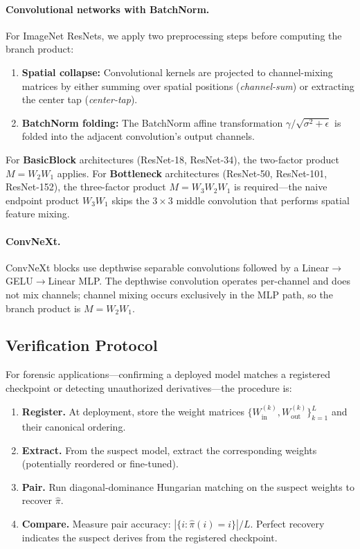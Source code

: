 \documentclass[wcp]{jmlr}
\begin{document}
\paragraph{Convolutional networks with BatchNorm.} For ImageNet ResNets, we apply two preprocessing steps before computing the branch product:
\begin{enumerate}[leftmargin=*,itemsep=2pt]
  \item \textbf{Spatial collapse:} Convolutional kernels are projected to channel-mixing matrices by either summing over spatial positions (\emph{channel-sum}) or extracting the center tap (\emph{center-tap}).
  \item \textbf{BatchNorm folding:} The BatchNorm affine transformation $\gamma / \sqrt{\sigma^2 + \epsilon}$ is folded into the adjacent convolution's output channels.
\end{enumerate}
For \textbf{BasicBlock} architectures (ResNet-18, ResNet-34), the two-factor product $M = W_2 W_1$ applies. For \textbf{Bottleneck} architectures (ResNet-50, ResNet-101, ResNet-152), the three-factor product $M = W_3 W_2 W_1$ is required---the naive endpoint product $W_3 W_1$ skips the $3 \times 3$ middle convolution that performs spatial feature mixing.

\paragraph{ConvNeXt.} ConvNeXt blocks use depthwise separable convolutions followed by a Linear$\to$GELU$\to$Linear MLP. The depthwise convolution operates per-channel and does not mix channels; channel mixing occurs exclusively in the MLP path, so the branch product is $M = W_2 W_1$.

\subsection{Verification Protocol}\label{sec:verification}

For forensic applications---confirming a deployed model matches a registered checkpoint or detecting unauthorized derivatives---the procedure is:

\begin{enumerate}[leftmargin=*,itemsep=2pt]
  \item \textbf{Register.} At deployment, store the weight matrices $\{W_{\mathrm{in}}^{(k)}, W_{\mathrm{out}}^{(k)}\}_{k=1}^L$ and their canonical ordering.
  \item \textbf{Extract.} From the suspect model, extract the corresponding weights (potentially reordered or fine-tuned).
  \item \textbf{Pair.} Run diagonal-dominance Hungarian matching on the suspect weights to recover $\hat\pi$.
  \item \textbf{Compare.} Measure pair accuracy: $|\{i : \hat\pi(i) = i\}|/L$. Perfect recovery indicates the suspect derives from the registered checkpoint.
\end{enumerate}
\end{document}
